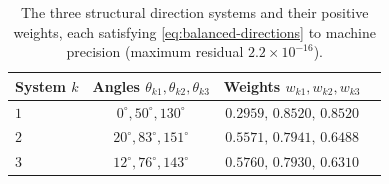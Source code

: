\documentclass[10pt,a4paper]{article}
\begin{document}
\begin{table}[h]
\centering
\caption{The three structural direction systems and their positive
weights, each satisfying \eqref{eq:balanced-directions} to machine
precision (maximum residual $2.2\times10^{-16}$).}
\label{tab:direction-systems}
\begin{tabular}{lccc}
\toprule
System $k$ & Angles $\theta_{k1},\theta_{k2},\theta_{k3}$ & Weights $w_{k1},w_{k2},w_{k3}$\\
\midrule
$1$ & $0^\circ,50^\circ,130^\circ$ & $0.2959,\,0.8520,\,0.8520$\\
$2$ & $20^\circ,83^\circ,151^\circ$ & $0.5571,\,0.7941,\,0.6488$\\
$3$ & $12^\circ,76^\circ,143^\circ$ & $0.5760,\,0.7930,\,0.6310$\\
\bottomrule
\end{tabular}
\end{table}
\end{document}
